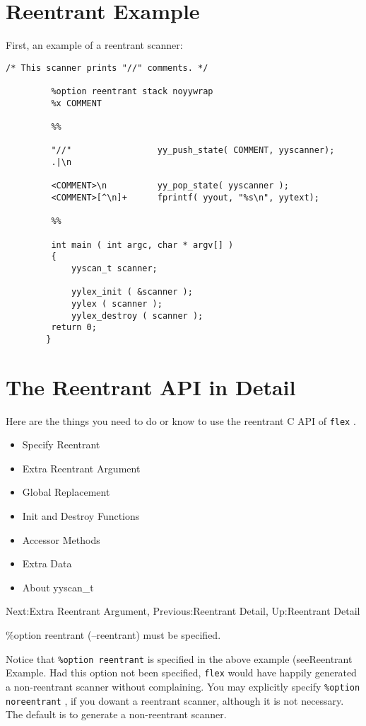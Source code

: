 \documentclass[openany,oneside]{book}
\begin{document}
\section{Reentrant Example}


First, an example of a reentrant scanner:
\begin{verbatim}
/* This scanner prints "//" comments. */
     
         %option reentrant stack noyywrap
         %x COMMENT
     
         %%
     
         "//"                 yy_push_state( COMMENT, yyscanner);
         .|\n
     
         <COMMENT>\n          yy_pop_state( yyscanner );
         <COMMENT>[^\n]+      fprintf( yyout, "%s\n", yytext);
     
         %%
     
         int main ( int argc, char * argv[] )
         {
             yyscan_t scanner;
     
             yylex_init ( &scanner );
             yylex ( scanner );
             yylex_destroy ( scanner );
         return 0;
        }
\end{verbatim}

\section{The Reentrant API in Detail}


Here are the things you need to do or know to use the reentrant C API of \verb`flex` .
\begin{itemize}
\item Specify Reentrant
\item Extra Reentrant Argument
\item Global Replacement
\item Init and Destroy Functions
\item Accessor Methods
\item Extra Data
\item About yyscan\_{}t
\end{itemize}



Next:Extra Reentrant Argument,
Previous:Reentrant Detail,
Up:Reentrant Detail

\%{}option reentrant (–reentrant) must be specified.

Notice that \verb`%option reentrant` is specified in the above example
(seeReentrant Example. Had this option not been specified, \verb`flex` would have happily generated a non-reentrant scanner without
complaining. You may explicitly specify \verb`%option noreentrant` , if
you dowant a reentrant scanner, although it is not
necessary. The default is to generate a non-reentrant scanner.
\end{document}
